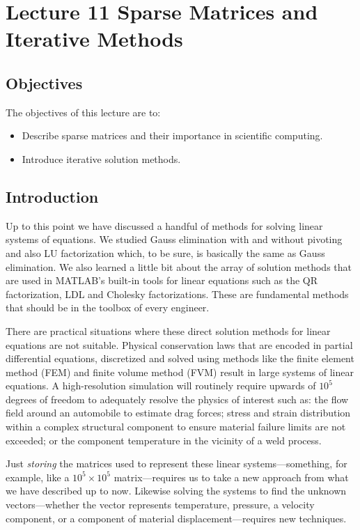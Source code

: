 \chapter{Lecture 11 Sparse Matrices and Iterative Methods}
\label{ch:lec11n}
\section{Objectives}
The objectives of this lecture are to:
\begin{itemize}
\item Describe sparse matrices and their importance in scientific computing.
\item Introduce iterative solution methods.
\end{itemize}
\setcounter{lstannotation}{0}

\section{Introduction}
Up to this point we have discussed a handful of methods for solving linear systems of equations.  We studied Gauss elimination with and without pivoting and also LU factorization which, to be sure, is basically the same as Gauss elimination.  We also learned a little bit about the array of solution methods that are used in MATLAB's built-in tools for linear equations such as the QR factorization, LDL and Cholesky factorizations.  These are fundamental methods that should be in the toolbox of every engineer.

There are practical situations where these direct solution methods for linear equations are not suitable.  Physical conservation laws that are encoded in partial differential equations, discretized and solved using methods like the finite element method (FEM) and finite volume method (FVM) result in large systems of linear equations.  A high-resolution simulation will routinely require upwards of $10^5$ degrees of freedom to adequately resolve the physics of interest such as: the flow field around an automobile to estimate drag forces; stress and strain distribution within a complex structural component to ensure material failure limits are not exceeded; or the component temperature in the vicinity of a weld process.

Just \emph{storing} the matrices used to represent these linear systems---something, for example, like a $10^5 \times 10^5$ matrix---requires us to take a new approach from what we have described up to now.  Likewise solving the systems to find the unknown vectors---whether the vector represents temperature, pressure, a velocity component, or a component of material displacement---requires new techniques.

